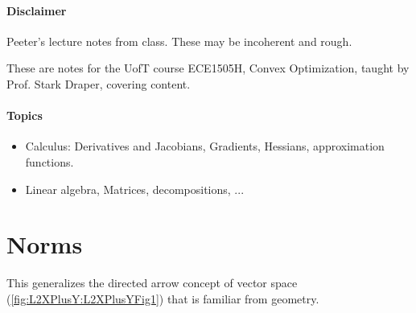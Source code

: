 
\renewcommand{\basename}{convex-optimization2}
\renewcommand{\dirname}{notes/ece1505/}
\newcommand{\keywords}{ECE1505H}


\usepackage{ece1505}
\usepackage{peeters_braket}
\usepackage{peeters_figures}
\usepackage{mathtools}
\usepackage{siunitx}
\usepackage{peeters_layout_exercise}

\beginArtNoToc
{}
\label{chap:convex-optimization2}

\paragraph{Disclaimer}

Peeter's lecture notes from class.  These may be incoherent and rough.

These are notes for the UofT course ECE1505H, Convex Optimization, taught by Prof. Stark Draper, covering  \citep{boyd2004convex} content.

\paragraph{Topics}

\begin{itemize}
\item Calculus: Derivatives and Jacobians, Gradients, Hessians, approximation functions.
\item Linear algebra, Matrices, decompositions, ...
\end{itemize}

\section{Norms}


This generalizes the directed arrow concept of vector space (\cref{fig:L2XPlusY:L2XPlusYFig1}) that is familiar from geometry.



